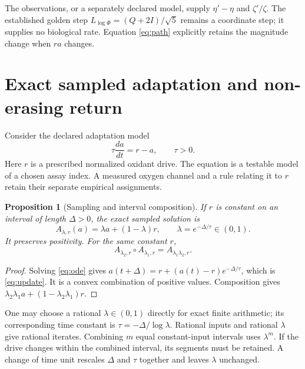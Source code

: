 \documentclass[11pt]{article}
\newtheorem{proposition}[theorem]{Proposition}
\newcommand{\Id}{I}
\begin{document}
The observations, or a separately declared model, supply
\(\eta'-\eta\) and \(\zeta'/\zeta\). The established golden step
\(L_{\log\Phi}=(Q+2\Id)/\sqrt5\) remains a coordinate step; it
supplies no biological rate. Equation \eqref{eq:path} explicitly retains
the magnitude change when \(ra\) changes.

\section{Exact sampled adaptation and non-erasing return}

Consider the declared adaptation model
\begin{equation}\label{eq:ode}
 \tau\frac{da}{dt}=r-a,\qquad \tau>0.
\end{equation}
Here \(r\) is a prescribed normalized oxidant drive. The equation is a
testable model of a chosen assay index. A measured oxygen channel and
a rule relating it to \(r\) retain their separate empirical assignments.

\begin{proposition}[Sampling and interval composition]\label{prop:sample}
If \(r\) is constant on an interval of length \(\Delta>0\), the exact
sampled solution is
\begin{equation}\label{eq:update}
 A_{\lambda,r}(a)=\lambda a+(1-\lambda)r,\qquad
 \lambda=e^{-\Delta/\tau}\in(0,1).
\end{equation}
It preserves positivity. For the same constant \(r\),
\begin{equation}\label{eq:composition}
 A_{\lambda_2,r}\circ A_{\lambda_1,r}
       =A_{\lambda_1\lambda_2,r}.
\end{equation}
\end{proposition}
\begin{proof}
Solving \eqref{eq:ode} gives
\(a(t+\Delta)=r+(a(t)-r)e^{-\Delta/\tau}\), which is
\eqref{eq:update}. It is a convex combination of positive values.
Composition gives
\(\lambda_2\lambda_1a+(1-\lambda_2\lambda_1)r\).
\end{proof}

One may choose a rational \(\lambda\in(0,1)\) directly for exact finite
arithmetic; its corresponding time constant is
\(\tau=-\Delta/\log\lambda\). Rational inputs and rational \(\lambda\)
give rational iterates. Combining \(m\) equal constant-input intervals
uses \(\lambda^m\). If the drive changes within the combined interval,
its segments must be retained. A change of time unit rescales
\(\Delta\) and \(\tau\) together and leaves \(\lambda\) unchanged.
\end{document}
